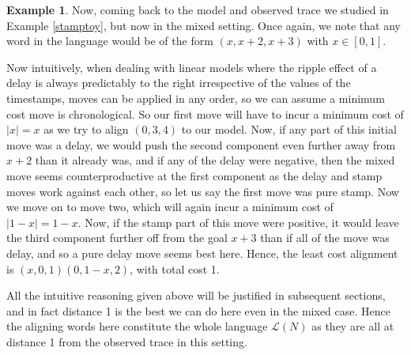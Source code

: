 \documentclass{article}
\theoremstyle{Definition}
\theoremstyle{definition}
\newtheorem{example}{Example}
\begin{document}
	\begin{example}\label{oldmodelmixex}
		Now, coming back to the model and observed trace we studied in Example \ref{stamptoy}, but now in the mixed setting. 
		Once again, we note that any word in the language would be of the form $(x, x+2, x+3)$ with $x \in [0, 1]$. 
		
		Now intuitively, when dealing with linear models where the ripple effect of a delay is always predictably to the right irrespective of the values of the timestamps, moves can be applied in any order, so we can assume a minimum cost move is chronological. 
		So our first move will have to incur a minimum cost of $|x| = x$ as we try to align $(0,3,4)$ to our model.
		Now, if any part of this initial move was a delay, we would push the second component even further away from $x+2$ than it already was, and if any of the delay were negative, then the mixed move seems counterproductive at the first component as the delay and stamp moves work against each other, so let us say the first move was pure stamp. 
		Now we move on to move two, which will again incur a minimum cost of $|1-x| = 1-x$. 
		Now, if the stamp part of this move were positive, it would leave the third component further off from the goal $x+3$ than if all of the move was delay, and so a pure delay move seems best here. 
		Hence, the least cost alignment is $(x, 0, 1)(0, 1-x, 2)$, with total cost 1. 
		
		All the intuitive reasoning given above will be justified in subsequent sections, and in fact distance 1 is the best we can do here even in the mixed case. 
		Hence the aligning words here constitute the whole language $\mathcal{L}(N)$ as they are all at distance 1 from the observed trace in this setting. 
	\end{example}
	
\end{document}
